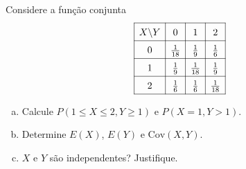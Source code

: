 %
%


\begin{exercicioBanco}[\valorquestao]
    Considere a função conjunta
    \[
        \renewcommand{\arraystretch}{1.5}
        \begin{array}{|c|c|c|c|}
            \hline
            X \backslash Y & 0 & 1 & 2 \\
            \hline
            0 & \frac{1}{18} & \frac{1}{9} & \frac{1}{6} \\
            \hline
            1 & \frac{1}{9} & \frac{1}{18} & \frac{1}{9} \\
            \hline
            2 & \frac{1}{6} & \frac{1}{6} & \frac{1}{18} \\
            \hline
        \end{array}
    \]
    \begin{enumerate}[(a)]
        \item Calcule \(P(1 \le X \le 2, Y \ge 1)\) e \(P(X = 1, Y > 1)\).
        \item Determine \(E(X)\), \(E(Y)\) e \(\text{Cov}(X,Y)\).
        \item \(X\) e \(Y\) são independentes? Justifique.
    \end{enumerate}
\end{exercicioBanco}

